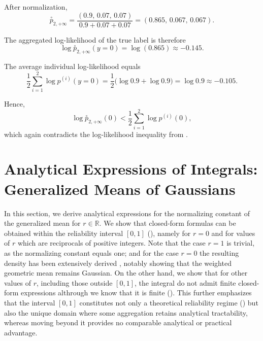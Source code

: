 \documentclass[accepted]{uai2026} %
\newcommand{\compose}[1]{\overset{\circ}{#1}}
\begin{document}
After normalization,
\begin{equation}
\compose{p}_{2,+\infty}
=
\frac{(0.9,\,0.07,\,0.07)}{0.9+0.07+0.07}
=
(0.865,\,0.067,\,0.067).
\end{equation}

The aggregated log-likelihood of the true label is therefore
\begin{equation}
\log \compose{p}_{2,+\infty}(y=0)
=
\log(0.865)
\approx -0.145.
\end{equation}

The average individual log-likelihood equals
\begin{equation}
\frac{1}{2}
\sum_{i=1}^{2}
\log p^{(i)}(y=0)
=
\frac{1}{2}
\big(
\log 0.9 + \log 0.9
\big)
=
\log 0.9
\approx -0.105.
\end{equation}

Hence,
\begin{equation}
\log \compose{p}_{2,+\infty}(0)
<
\frac{1}{2}
\sum_{i=1}^{2}
\log p^{(i)}(0),
\end{equation}
which again contradicts the log-likelihood inequality from .


\section{Analytical Expressions of Integrals: Generalized Means of Gaussians}\label{app: analytical expressions}

In this section, we derive analytical expressions for the normalizing constant of the generalized mean for $r \in \mathbb{R}$. We show that closed-form formulas can be obtained within the reliability interval $[0,1]$ (), namely for $r=0$ and for values of $r$ which are reciprocals of positive integers. Note that the case $r=1$ is trivial, as the normalizing constant equals one; and for the case $r=0$ the resulting density has been extensively derived \citep{cao2014generalized,cohen2021healing}, notably showing that the weighted geometric mean remains Gaussian. On the other hand, we show that for other values of $r$, including those outside $[0,1]$, the integral do not admit finite closed-form expressions althrough we know that it is finite (). This further emphasizes that the interval $[0,1]$ constitutes not only a theoretical reliability regime () but also the unique domain where some aggregation retains analytical tractability, whereas moving beyond it provides no comparable analytical or practical advantage.
\end{document}
